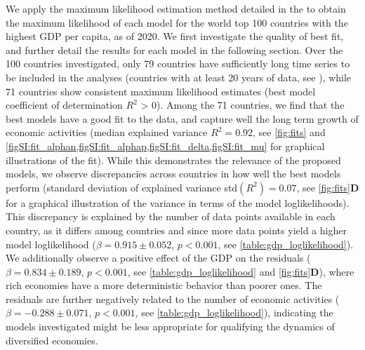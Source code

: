 We apply the maximum likelihood estimation method detailed in the  to obtain the maximum likelihood of each model for the world top 100 countries with the highest GDP per capita, as of 2020. We first investigate the quality of best fit, and further detail the results for each model in the following section. %
% 
Over the 100 countries investigated, only 79 countries have sufficiently long time series to be included in the analyses (countries with at least 20 years of data, see ), while 71 countries show consistent maximum likelihood estimates (best model coefficient of determination $R^2$ > 0).
% 
Among the 71 countries, we find that the best models have a good fit to the data, and capture well the long term growth of economic activities (median explained variance $R^2 = 0.92$, see \cref{fig:fits} and \cref{figSI:fit_alphan,figSI:fit_alphap,figSI:fit_delta,figSI:fit_mu} for graphical illustrations of the fit).
% 
While this demonstrates the relevance of the proposed models, we observe discrepancies across countries in how well the best models perform (standard deviation of explained variance std$(R^2)= 0.07$, see \cref{fig:fits}\textbf{D} for a graphical illustration of the variance in terms of the model loglikelihoods).
% 
% 
This discrepancy is explained by the number of data points available in each country, as it differs among countries and since more data points yield a higher model loglikelihood ($\beta = 0.915 \pm 0.052$, $p<0.001$, see \cref{table:gdp_loglikelihood}).
% 
We additionally observe a positive effect of the GDP on the residuals ($\beta = 0.834 \pm 0.189$, $p<0.001$, see \cref{table:gdp_loglikelihood} and \cref{fig:fits}\textbf{D}), where rich economies have a more deterministic behavior than poorer ones. The residuals are further negatively related to the number of economic activities ($\beta = -0.288 \pm 0.071$, $p<0.001$, see \cref{table:gdp_loglikelihood}), indicating the models investigated might be less appropriate for qualifying the dynamics of diversified economies.
% 
% 

